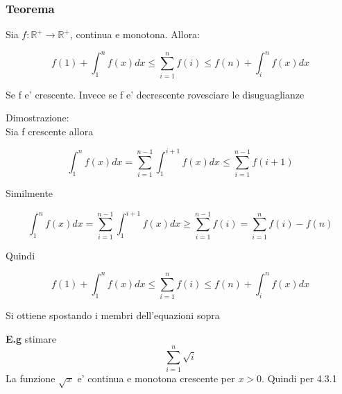 \documentclass{article}
\begin{document}
        \subsubsection{Teorema}
        \begin{flushleft}
          Sia $f:\mathbb{R}^+ \to \mathbb{R}^+$, continua e monotona. Allora:
        \end{flushleft}
        \begin{equation*}
          f(1)+\int_1^n f(x)dx \leq \sum_{i=1}^n f(i) \leq f(n)+\int^n_i f(x)dx
        \end{equation*}
        \begin{flushleft}
          Se f e' crescente. Invece se f e' decrescente rovesciare le disuguaglianze
        \end{flushleft}
        \begin{flushleft}
          Dimostrazione: \\ 
          Sia f crescente allora
        \end{flushleft}
        \begin{equation*}
          \int_1^n f(x)dx=\sum_{i=1}^{n-1} \int^{i+1}_1 f(x)dx \leq \sum_{i=1}^{n-1} f(i+1)
        \end{equation*} 
        \begin{flushleft}
          Similmente
        \end{flushleft}
        \begin{equation*}
          \int_1^n f(x)dx=\sum_{i=1}^{n-1} \int^{i+1}_1 f(x)dx \geq \sum_{i=1}^{n-1} f(i)=\sum_{i=1}^n f(i) - f(n)
        \end{equation*}
        \begin{flushleft}
          Quindi
        \end{flushleft}
        \begin{equation*}
          f(1)+\int_1^n f(x)dx \leq \sum_{i=1}^n f(i) \leq f(n)+\int^n_i f(x)dx
        \end{equation*}
        \begin{flushleft}
          Si ottiene spostando i membri dell'equazioni sopra
        \end{flushleft}
        \begin{flushleft}
          \textbf{E.g} stimare 
          \begin{equation*}
            \sum_{i=1}^n \sqrt{i}
          \end{equation*}
          La funzione $\sqrt{x}$ e' continua e monotona crescente per $x>0$. Quindi per 4.3.1
        \end{flushleft}
\end{document}
